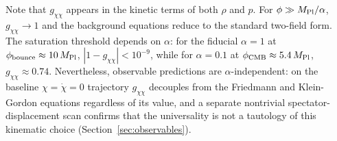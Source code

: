 \documentclass[11pt,a4paper]{article}
\begin{document}
Note that $g_{\chi\chi}$ appears in the kinetic terms of both $\rho$ and $p$. For $\phi \gg M_{\rm Pl}/\alpha$, $g_{\chi\chi} \to 1$ and the background equations reduce to the standard two-field form. The saturation threshold depends on $\alpha$: for the fiducial $\alpha = 1$ at $\phi_{\rm bounce} \approx 10\,M_{\rm Pl}$, $|1 - g_{\chi\chi}| < 10^{-9}$, while for $\alpha = 0.1$ at $\phi_{\rm CMB} \approx 5.4\,M_{\rm Pl}$, $g_{\chi\chi} \approx 0.74$. Nevertheless, observable predictions are $\alpha$-independent: on the baseline $\chi = \dot\chi = 0$ trajectory $g_{\chi\chi}$ decouples from the Friedmann and Klein-Gordon equations regardless of its value, and a separate nontrivial spectator-displacement scan confirms that the universality is not a tautology of this kinematic choice (Section~\ref{sec:observables}).
\end{document}
